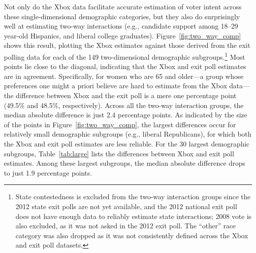 \documentclass[preprint,authoryear,12pt]{elsarticle}
\begin{document}
Not only do the Xbox data facilitate accurate estimation of voter intent across
these single-dimensional demographic categories, but they also do surprisingly
well at estimating two-way interactions (e.g., candidate support among 18--29
year-old Hispanics, and liberal college graduates). Figure~\ref{fig:two_way_comp}
shows this result, plotting the Xbox estimates against those derived from the
exit polling data for each of the 149 two-dimensional demographic
subgroups.\footnote{State contestedness is excluded from the two-way
  interaction groups since the 2012 state exit polls are not yet available, and
  the 2012 national exit poll does not have enough data to reliably estimate
  state interactions; 2008 vote is also excluded, as it was not asked in the
  2012 exit poll. The ``other'' race category was also dropped as it was
  not consistently defined across the Xbox and exit poll datasets.}
Most points lie close to the diagonal, indicating that the Xbox and exit poll
estimates are in agreement.  Specifically, for women who are 65 and older---a
group whose preferences one might a priori believe are hard to estimate from the
Xbox data---the difference between Xbox and the exit poll is a mere one
percentage point (49.5\% and 48.5\%, respectively).  Across all the two-way
interaction groups, the median absolute difference is just 2.4 percentage
points. As indicated by the size of the points in Figure~\ref{fig:two_way_comp}, 
the largest differences occur for relatively
small demographic subgroups (e.g., liberal Republicans), for which both the Xbox and exit poll estimates are less reliable.
For the 30 largest demographic subgroups,
Table~\ref{tab:large} lists the differences between Xbox and exit poll
estimates. Among these largest subgroups, the median absolute difference
drops to just 1.9 percentage points.
\end{document}
